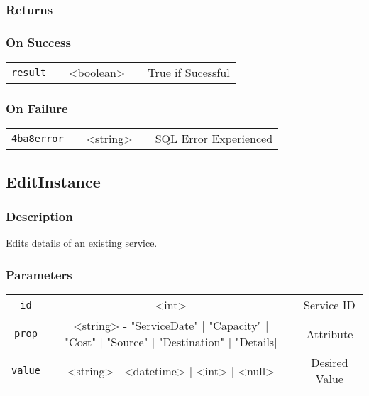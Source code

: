 \documentclass[a4paper,12pt]{article}
\begin{document}
\subsubsection{Returns}

\subsubsection{On Success}

\begin{tabular}{ccccc}
\verb!result! & \vspace{15mm} & <boolean> & \vspace{15mm} & True if Sucessful \\
\end{tabular}

\subsubsection{On Failure}

\begin{tabular}{ccccc}
\verb!4ba8error! & \vspace{15mm} & <string> & \vspace{15mm} & SQL Error Experienced \\
\end{tabular}


\subsection{EditInstance}

\subsubsection{Description}

Edits details of an existing service.

\subsubsection{Parameters}

\begin{tabular}{ccccc}
\verb!id! & \vspace{15mm} & <int> & \vspace{15mm} & Service ID \\
\verb!prop! & \vspace{15mm} & <string> - "ServiceDate" | "Capacity" | "Cost" | "Source" | "Destination" | "Details|& \vspace{15mm} & Attribute  \\
\verb!value! & \vspace{15mm} & <string> | <datetime> | <int> | <null> & \vspace{15mm} & Desired Value \\
\end{tabular}
\end{document}
